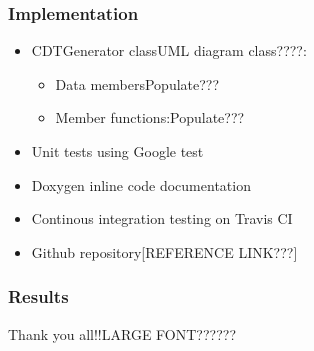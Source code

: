 \documentclass{beamer}
\begin{document}
	\begin{frame}
		\frametitle{Implementation}
			\begin{itemize}
				\item CDTGenerator class{UML diagram class????}:
					\begin{itemize}
						\item Data members{Populate???}
						\item Member functions:{Populate???}	
					\end{itemize}		
				\item Unit tests using Google test
				\item Doxygen inline code documentation
				\item Continous integration testing on Travis CI	
				\item Github repository[REFERENCE LINK???]	
			\end{itemize}
	\end{frame}	
	\begin{frame}
		\frametitle{Results} 	
	\end{frame}	
	\begin{frame}
		Thank you all!!{LARGE FONT??????}
	\end{frame}	


\end{document}
